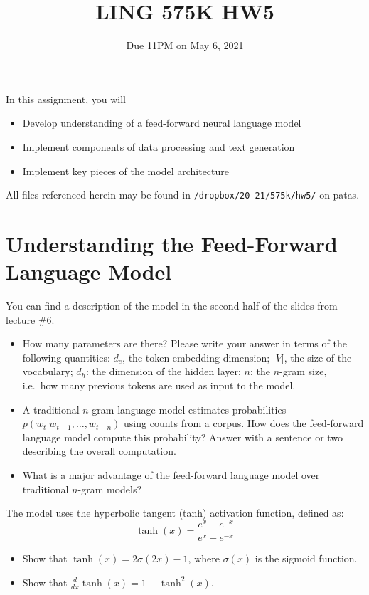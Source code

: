 \documentclass[11pt]{article}
\begin{document}
\title{LING 575K HW5}
\date{\vspace{-0.2in}Due 11PM on May 6, 2021}
\maketitle


\noindent In this assignment, you will 
\begin{itemize}
  \item Develop understanding of a feed-forward neural language model
  \item Implement components of data processing and text generation
  \item Implement key pieces of the model architecture
\end{itemize}
All files referenced herein may be found in \texttt{/dropbox/20-21/575k/hw5/} on patas.


\section{Understanding the Feed-Forward Language Model}

  You can find a description of the model in the second half of the slides from lecture \#6.
\begin{itemize}
  \item How many parameters are there?  Please write your answer in terms of the following quantities: $d_e$, the token embedding dimension; $|V|$, the size of the vocabulary; $d_h$: the dimension of the hidden layer; $n$: the $n$-gram size, i.e.\ how many previous tokens are used as input to the model.
  \item A traditional $n$-gram language model estimates probabilities $p(w_t | w_{t-1} , \dots , w_{t-n})$ using counts from a corpus.  How does the feed-forward language model compute this probability?  Answer with a sentence or two describing the overall computation.
  \item What is a major advantage of the feed-forward language model over traditional $n$-gram models?
\end{itemize}


\vspace{2em}
 The model uses the hyperbolic tangent (tanh) activation function, defined as:
\[ \tanh(x) = \frac{e^x - e^{-x}}{e^x + e^{-x}} \]
\begin{itemize}
  \item Show that $\tanh(x) = 2\sigma(2x) - 1$, where $\sigma(x)$ is the sigmoid function.
  \item Show that $\frac{d}{dx}\tanh(x) = 1 - \tanh^2(x)$.
\end{itemize}
\end{document}
